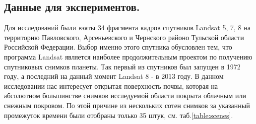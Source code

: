 \documentclass[14pt]{extarticle}
\begin{document}
\subsection{Данные для экспериментов.}

\par
Для исследований были взяты 34 фрагмента кадров спутников Landsat 5, 7, 8 
на территорию Павловского, Арсеньевского и Чернского районо Тульской области Российской Федерации.
Выбор именно этого спутника обусловлен тем, что программа Landsat является наиболее
продолжительным проектом по получению спутниковых снимков планеты. Так первый из спутников
был запущен в 1972 году, а последний на данный момент Landsat 8 - в 2013 году.
В данном исследовании нас интересует открытая поверхность почвы, которая на абсолютном
большинстве снимков исследуемой области покрыта облачным или снежным покровом.
По этой причине из нескольких сотен снимков за указанный промежуток времени были
отобраны только 35 штук, см. таб.\ref{table:scenes}.
\end{document}
